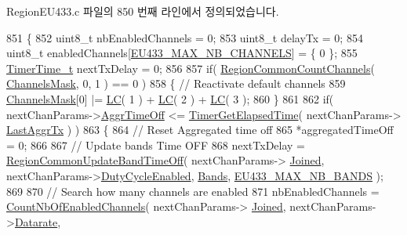 Region\+E\+U433.\+c 파일의 850 번째 라인에서 정의되었습니다.


\begin{DoxyCode}
851 \{
852     uint8\_t nbEnabledChannels = 0;
853     uint8\_t delayTx = 0;
854     uint8\_t enabledChannels[\mbox{\hyperlink{group___r_e_g_i_o_n_e_u433_ga800fbd07b871c93758364a0311b87937}{EU433\_MAX\_NB\_CHANNELS}}] = \{ 0 \};
855     \mbox{\hyperlink{utilities_8h_a4215ca43d3e953099ea758ce428599d0}{TimerTime\_t}} nextTxDelay = 0;
856 
857     \textcolor{keywordflow}{if}( \mbox{\hyperlink{group___r_e_g_i_o_n_c_o_m_m_o_n_gac23f0831812f610f57f42f6cf87368c9}{RegionCommonCountChannels}}( \mbox{\hyperlink{_region_e_u433_8c_a2188957b5ca6af8092154d7ccbfa5757}{ChannelsMask}}, 0, 1 ) == 0 )
858     \{ \textcolor{comment}{// Reactivate default channels}
859         \mbox{\hyperlink{_region_e_u433_8c_a2188957b5ca6af8092154d7ccbfa5757}{ChannelsMask}}[0] |= \mbox{\hyperlink{group___r_e_g_i_o_n_ga12fa17e5c1016e01a9d82c25027deb1b}{LC}}( 1 ) + \mbox{\hyperlink{group___r_e_g_i_o_n_ga12fa17e5c1016e01a9d82c25027deb1b}{LC}}( 2 ) + \mbox{\hyperlink{group___r_e_g_i_o_n_ga12fa17e5c1016e01a9d82c25027deb1b}{LC}}( 3 );
860     \}
861 
862     \textcolor{keywordflow}{if}( nextChanParams->\mbox{\hyperlink{structs_next_chan_params_a3609676d2d3b7c00e25615324b35cb26}{AggrTimeOff}} <= \mbox{\hyperlink{time_server_8c_a9ca7e27f3d6474daff63f2e093a2e91e}{TimerGetElapsedTime}}( nextChanParams->
      \mbox{\hyperlink{structs_next_chan_params_a381b728f60b185ecf3313e974c18768b}{LastAggrTx}} ) )
863     \{
864         \textcolor{comment}{// Reset Aggregated time off}
865         *aggregatedTimeOff = 0;
866 
867         \textcolor{comment}{// Update bands Time OFF}
868         nextTxDelay = \mbox{\hyperlink{group___r_e_g_i_o_n_c_o_m_m_o_n_ga2e26fe6b49ca26edf7052eadd7f18b3a}{RegionCommonUpdateBandTimeOff}}( nextChanParams->
      \mbox{\hyperlink{structs_next_chan_params_ac2f6caa0f3b02d2ac5056c3ee7c22652}{Joined}}, nextChanParams->\mbox{\hyperlink{structs_next_chan_params_a4d755868e0e80089462286c3ba6a6f18}{DutyCycleEnabled}}, \mbox{\hyperlink{_region_e_u433_8c_a6c5b6e34893684b2def82b051e03096b}{Bands}}, 
      \mbox{\hyperlink{group___r_e_g_i_o_n_e_u433_gaa45efc26cd18a760845f97a06f49bd9b}{EU433\_MAX\_NB\_BANDS}} );
869 
870         \textcolor{comment}{// Search how many channels are enabled}
871         nbEnabledChannels = \mbox{\hyperlink{_region_e_u433_8c_a84ed01aa0ea6f1e53707efb5aaa3bd97}{CountNbOfEnabledChannels}}( nextChanParams->
      \mbox{\hyperlink{structs_next_chan_params_ac2f6caa0f3b02d2ac5056c3ee7c22652}{Joined}}, nextChanParams->\mbox{\hyperlink{structs_next_chan_params_ae2f6080f3aa0e9485c55513ca56bb24d}{Datarate}},

\end{DoxyCode}
